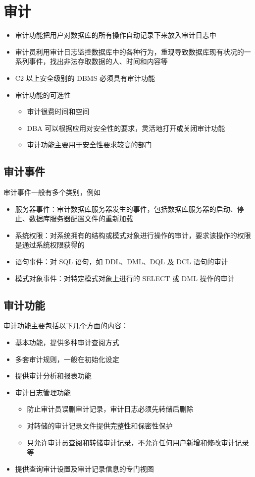 \section{审计}
\begin{itemize}
    \item 审计功能把用户对数据库的所有操作自动记录下来放入审计日志中
    \item 审计员利用审计日志监控数据库中的各种行为，重现导致数据库现有状况的一系列事件，找出非法存取数据的人、时间和内容等
    \item C2 以上安全级别的 DBMS 必须具有审计功能
    \item 审计功能的可选性
    \begin{itemize}
        \item 审计很费时间和空间
        \item DBA 可以根据应用对安全性的要求，灵活地打开或关闭审计功能
        \item 审计功能主要用于安全性要求较高的部门
    \end{itemize}
\end{itemize}

\subsection{审计事件}
审计事件一般有多个类别，例如
\begin{itemize}
    \item 服务器事件：审计数据库服务器发生的事件，包括数据库服务器的启动、停止、数据库服务器配置文件的重新加载
    \item 系统权限：对系统拥有的结构或模式对象进行操作的审计，要求该操作的权限是通过系统权限获得的
    \item 语句事件：对 SQL 语句，如 DDL、DML、DQL 及 DCL 语句的审计
    \item 模式对象事件：对特定模式对象上进行的 SELECT 或 DML 操作的审计 
\end{itemize}

\subsection{审计功能}
审计功能主要包括以下几个方面的内容：
\begin{itemize}
    \item 基本功能，提供多种审计查阅方式
    \item 多套审计规则，一般在初始化设定
    \item 提供审计分析和报表功能
    \item 审计日志管理功能
    \begin{itemize}
        \item 防止审计员误删审计记录，审计日志必须先转储后删除
        \item 对转储的审计记录文件提供完整性和保密性保护
        \item 只允许审计员查阅和转储审计记录，不允许任何用户新增和修改审计记录等
    \end{itemize}
    \item 提供查询审计设置及审计记录信息的专门视图
\end{itemize}

